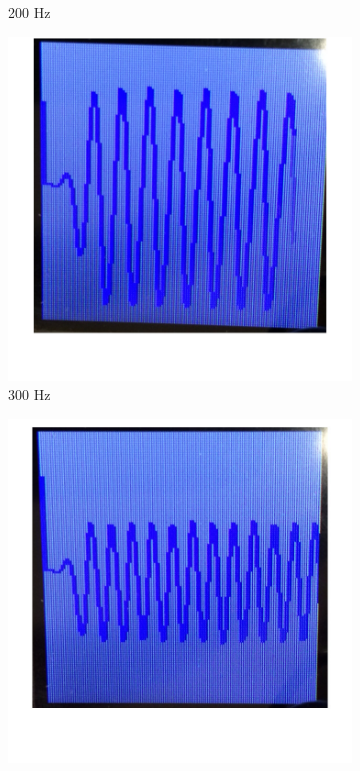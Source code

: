 \documentclass[12pt]{article}
\begin{document}
\begin{figure}[H]
\begin{subfigure}[b]{0.3\textwidth}
    \caption{200 Hz}
    \label{fig:filtered_200}
  \end{subfigure}
  \begin{subfigure}[b]{0.3\textwidth}
    \includegraphics[width=\textwidth]{./img/filtered_300Hz}
    \caption{300 Hz}
    \label{fig:filtered_300}
  \end{subfigure}
  \begin{subfigure}[b]{0.3\textwidth}
    \includegraphics[width=\textwidth]{./img/filtered_400Hz}

\end{subfigure}
\end{figure}
\end{document}
